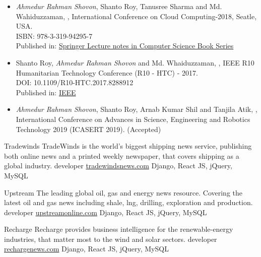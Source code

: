 \documentclass[10pt,a4paper]{altacv}
\begin{document}
\begin{itemize}
\item \emph{Ahmedur Rahman Shovon}, Shanto Roy, Tanusree Sharma and Md. Wahiduzzaman, , International Conference on Cloud Computing-2018, Seatle, USA. 
\\
ISBN: 978-3-319-94295-7
\\
Published in: \href{https://link.springer.com/chapter/10.1007%2F978-3-319-94295-7_19}{Springer Lecture notes in Computer Science Book Series}

\divider
\item Shanto Roy, \emph{Ahmedur Rahman Shovon} and Md. Whaiduzzaman, , IEEE R10 Humanitarian Technology Conference (R10 - HTC) - 2017. 
\\ 
DOI: 10.1109/R10-HTC.2017.8288912
\\
Published in: \href{http://ieeexplore.ieee.org/document/8288912/}{IEEE}

\divider
\item \emph{Ahmedur Rahman Shovon}, Shanto Roy, Arnab Kumar Shil and Tanjila Atik, , International Conference on Advances in Science, Engineering and Robotics Technology 2019 (ICASERT 2019). 
(Accepted)
\end{itemize}
\medskip
{}
\cvproject
{Tradewinds}
{TradeWinds is the world's biggest shipping news service, publishing both online news and a printed weekly newspaper, that covers shipping as a global industry.}
{developer}
{\href{http://www.tradewindsnews.com/}{tradewindsnews.com}}
{Django, React JS, jQuery, MySQL}
\divider

\cvproject
{Upstream}
{The leading global oil, gas and energy news resource. Covering the latest oil and gas news including shale, lng, drilling, exploration and production.}
{developer}
{\href{http://www.upstreamonline.com/}{upstreamonline.com}}
{Django, React JS, jQuery, MySQL}
\divider

\cvproject
{Recharge}
{Recharge provides business intelligence for the renewable-energy industries, that matter most to the wind and solar sectors.}
{developer}
{\href{http://www.rechargenews.com/}{rechargenews.com}}
{Django, React JS, jQuery, MySQL}
\divider
\end{document}
